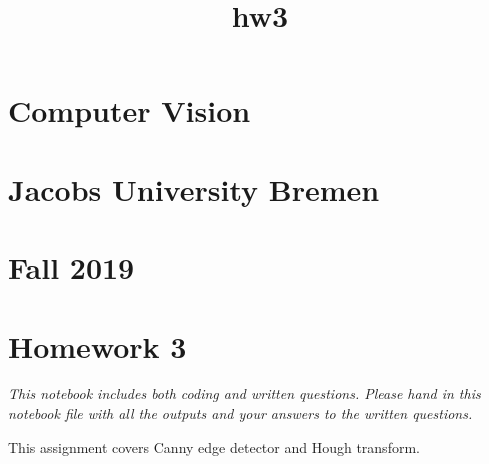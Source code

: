 \documentclass[11pt]{article}
\title{hw3}
\begin{document}
    
    
    \maketitle
    
    

    
    \hypertarget{computer-vision}{%
\section{Computer Vision}\label{computer-vision}}

\hypertarget{jacobs-university-bremen}{%
\section{Jacobs University Bremen}\label{jacobs-university-bremen}}

\hypertarget{fall-2019}{%
\section{Fall 2019}\label{fall-2019}}

\hypertarget{homework-3}{%
\section{Homework 3}\label{homework-3}}

\emph{This notebook includes both coding and written questions. Please
hand in this notebook file with all the outputs and your answers to the
written questions.}

This assignment covers Canny edge detector and Hough transform.
\end{document}
